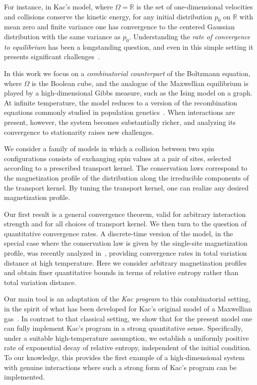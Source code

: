\documentclass[11pt,reqno]{amsart}
\numberwithin{equation}{section}
\numberwithin{figure}{section}
\newcommand{\1}{\mathds{1}}
\begin{document}
For instance, in Kac's model, where \( \Omega = \mathbb{R} \) is the set of one-dimensional velocities and collisions conserve the kinetic energy, for  any initial distribution \( p_0 \) on \( \mathbb{R} \) with mean zero and finite variance one has convergence to the centered Gaussian distribution with the same variance as $p_0$.  
Understanding the \emph{rate of convergence to equilibrium} has been a longstanding question, and even in this simple setting it presents significant challenges~\cite{KAC,Vill1,Vill2,entfound,Dolera}.


In this work we focus on a \emph{combinatorial counterpart} of the Boltzmann equation, where \( \Omega \) is the Boolean cube, and the analogue of the Maxwellian equilibrium is played by a high-dimensional Gibbs measure, such as the Ising model on a graph.  
At infinite temperature, the model reduces to a version of the recombination equations commonly studied in population genetics~\cite{Sinetal,Sinetal2,CP2024nonlinear}.  
When interactions are present, however, the system becomes substantially richer, and analyzing its convergence to stationarity raises new challenges.

We consider a family of models in which a collision between two spin configurations consists of exchanging spin values at a pair of sites, selected according to a prescribed transport kernel.  
The conservation laws correspond to the magnetization profile of the distribution along the irreducible components of the transport kernel.  
By tuning the transport kernel, one can realize any desired magnetization profile.  

Our first result is a general convergence theorem, valid for arbitrary interaction strength and for all choices of transport kernel.  
We then turn to the question of quantitative convergence rates.  
A discrete-time version of the model, in the special case where the conservation law is given by the single-site magnetization profile, was recently analyzed in~\cite{AC2024nonlinear}, providing convergence rates in total variation distance at high temperature.  
Here we consider arbitrary magnetization profiles and obtain finer quantitative bounds in terms of relative entropy rather than total variation distance.


Our main tool is an adaptation of the \emph{Kac program} to this combinatorial setting, in the spirit of what has been developed for Kac's original model of a Maxwellian gas~\cite{entfound,kacsprog}.  
In contrast to that classical setting, we show that for the present model one can fully implement Kac's program in a strong quantitative sense.  
Specifically, under a suitable high-temperature assumption, we establish a uniformly positive rate of exponential decay of relative entropy, independent of the initial condition.  
To our knowledge, this provides the first example of a high-dimensional system with genuine interactions where such a strong form of Kac's program can be implemented.
\end{document}
